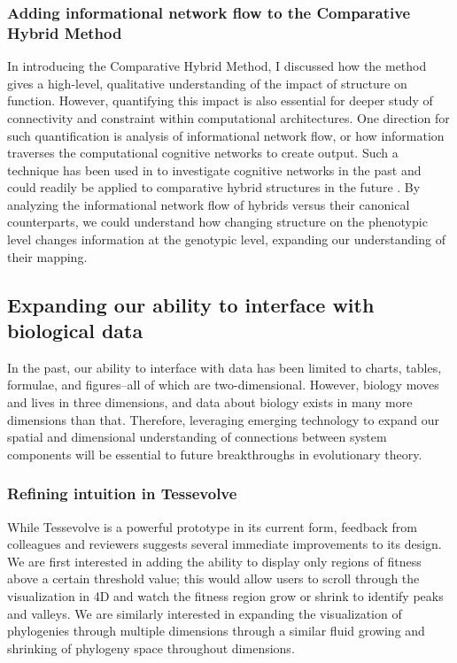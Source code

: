 \subsubsection{Adding informational network flow to the Comparative Hybrid Method}

In introducing the Comparative Hybrid Method, I discussed how the method gives a high-level, qualitative understanding of the impact of structure on function. 
However, quantifying this impact is also essential for deeper study of connectivity and constraint within computational architectures.
One direction for such quantification is analysis of informational network flow, or how information traverses the computational cognitive networks to create output.
Such a technique has been used in to investigate cognitive networks in the past and could readily be applied to comparative hybrid structures in the future \citep{bohm_information_2022}. 
By analyzing the informational network flow of hybrids versus their canonical counterparts, we could understand how changing structure on the phenotypic level changes information at the genotypic level, expanding our understanding of their mapping.

\subsection{Expanding our ability to interface with biological data}

In the past, our ability to interface with data has been limited to charts, tables, formulae, and figures--all of which are two-dimensional. However, biology moves and lives in three dimensions, and data about biology exists in many more dimensions than that. Therefore, leveraging emerging technology to expand our spatial and dimensional understanding of connections between system components will be essential to future breakthroughs in evolutionary theory.

\subsubsection{Refining intuition in Tessevolve}

While Tessevolve is a powerful prototype in its current form, feedback from colleagues and reviewers suggests several immediate improvements to its design. We are first interested in adding the ability to display only regions of fitness above a certain threshold value; this would allow users to scroll through the visualization in 4D and watch the fitness region grow or shrink to identify peaks and valleys. We are similarly interested in expanding the visualization of phylogenies through multiple dimensions through a similar fluid growing and shrinking of phylogeny space throughout dimensions.

